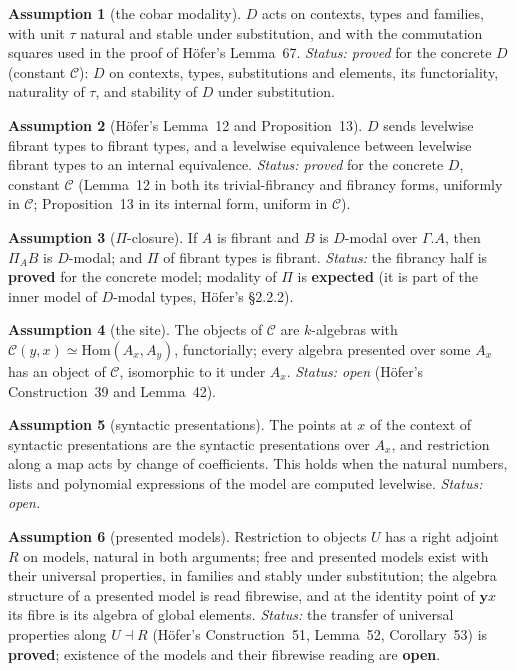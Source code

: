 \documentclass[11pt]{amsart}
\theoremstyle{definition}
\newtheorem{assumption}{Assumption}
\theoremstyle{remark}
\newcommand{\Hom}{\mathrm{Hom}}
\newcommand{\yo}{\mathbf{y}}
\begin{document}
\begin{assumption}[the cobar modality]\label{a:D}
$D$ acts on contexts, types and families, with unit $\tau$ natural and
stable under substitution, and with the commutation squares used in the
proof of H\"ofer's Lemma~67.
\emph{Status: proved} for the concrete $D$ (constant $\mathcal C$): $D$ on contexts, types,
substitutions and elements, its functoriality, naturality of $\tau$, and
stability of $D$ under substitution.
\end{assumption}

\begin{assumption}[H\"ofer's Lemma~12 and Proposition~13]\label{a:prop13}
$D$ sends levelwise fibrant types to fibrant types, and a levelwise
equivalence between levelwise fibrant types to an internal equivalence.
\emph{Status: proved} for the concrete $D$, constant $\mathcal C$ (Lemma~12 in both its
trivial-fibrancy and fibrancy forms, uniformly in $\mathcal C$;
Proposition~13 in its internal form, uniform in $\mathcal C$).
\end{assumption}

\begin{assumption}[$\Pi$-closure]\label{a:modpi}
If $A$ is fibrant and $B$ is $D$-modal over $\Gamma.A$, then $\Pi_A B$
is $D$-modal; and $\Pi$ of fibrant types is fibrant.
\emph{Status:} the fibrancy half is \textbf{proved} for the concrete
model; modality of $\Pi$ is \textbf{expected} (it is part of the inner
model of $D$-modal types, H\"ofer's \S2.2.2).
\end{assumption}

\begin{assumption}[the site]\label{a:site}
The objects of $\mathcal C$ are $k$-algebras with $\mathcal C(y,x)\simeq
\Hom(A_x, A_y)$, functorially; every algebra presented over some $A_x$ has
an object of $\mathcal C$, isomorphic to it under $A_x$.
\emph{Status: open} (H\"ofer's Construction~39 and Lemma~42).
\end{assumption}

\begin{assumption}[syntactic presentations]\label{a:syn}
The points at $x$ of the context of syntactic presentations are the
syntactic presentations over $A_x$, and restriction along a map acts by
change of coefficients. This holds when the natural numbers, lists and
polynomial expressions of the model are computed levelwise.
\emph{Status: open.}
\end{assumption}

\begin{assumption}[presented models]\label{a:pmod}
Restriction to objects $U$ has a right adjoint $R$ on models, natural in
both arguments; free and presented models exist with their universal
properties, in families and stably under substitution; the algebra
structure of a presented model is read fibrewise, and at the identity point
of $\yo x$ its fibre is its algebra of global elements.
\emph{Status:} the transfer of universal properties along $U\dashv R$
(H\"ofer's Construction~51, Lemma~52, Corollary~53) is \textbf{proved};
existence of the models and their fibrewise reading are \textbf{open}.
\end{assumption}
\end{document}
